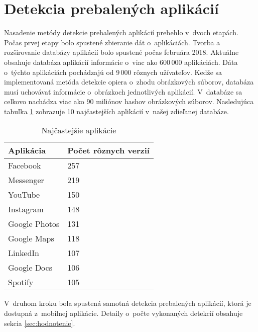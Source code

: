 \section{Detekcia prebalených aplikácií}
Nasadenie metódy detekcie prebalených aplikácií prebehlo v~dvoch etapách. Počas prvej etapy bolo spustené zbieranie dát o~aplikáciách. Tvorba a rozširovanie databázy aplikácií bolo spustené počas februára 2018. Aktuálne obsahuje databáza aplikácií informácie o~viac ako 600\,000 aplikáciách. Dáta o~týchto aplikáciách pochádzajú od 9\,000 rôznych užívateľov. Kedže sa implementovaná metóda detekcie opiera o~zhodu obrázkových súborov, databáza musí uchovávať informácie o~obrázkoch jednotlivých aplikácií. V~databáze sa celkovo nachádza viac ako 90 miliónov hashov obrázkových súborov.
Nasledujúca tabuľka \ref{apps-common} zobrazuje 10 najčastejších aplikácií v~našej zdieľanej databáze.

\begin{table}[]
\centering
\begin{tabular}{|l|l|}
\hline
Aplikácia     & Počet rôznych verzií \\ \hline
Facebook      & 257                  \\
Messenger     & 219                  \\
YouTube       & 150                   \\
Instagram     & 148                  \\
Google Photos & 131                   \\
Google Maps   & 118                   \\
LinkedIn      & 107                   \\
Google Docs   & 106                   \\ 
Spotify       & 105                   \\ \hline
\end{tabular}
\caption{Najčastejšie aplikácie}
\label{apps-common}
\end{table}

V~druhom kroku bola spustená samotná detekcia prebalených aplikácií, ktorá je dostupná z~mobilnej aplikácie. Detaily o~počte vykonaných detekcií obsahuje sekcia \ref{sec:hodnotenie}.
